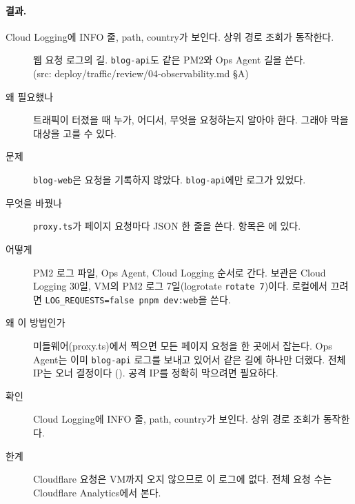 \paragraph{결과.}
Cloud Logging에 INFO 줄, path, country가 보인다.
상위 경로 조회가 동작한다.

\begin{figure}[H]
  \centering
  \caption{웹 요청 로그의 길. \texttt{blog-api}도 같은 PM2와 Ops Agent 길을 쓴다.
  (src: deploy/traffic/review/04-observability.md §A)}\label{fig:06-log-pipeline}
\end{figure}

\begin{description}
  \item[왜 필요했나] 트래픽이 터졌을 때 누가, 어디서, 무엇을 요청하는지 알아야 한다. 그래야 막을 대상을 고를 수 있다.
  \item[문제] \texttt{blog-web}은 요청을 기록하지 않았다. \texttt{blog-api}에만 로그가 있었다.
  \item[무엇을 바꿨나] \texttt{proxy.ts}가 페이지 요청마다 JSON 한 줄을 쓴다. 항목은 에 있다.
  \item[어떻게] PM2 로그 파일, Ops Agent, Cloud Logging 순서로 간다. 보관은 Cloud Logging 30일, VM의 PM2 로그 7일(logrotate \texttt{rotate 7})이다. 로컬에서 끄려면 \texttt{LOG\_REQUESTS=false pnpm dev:web}을 쓴다.
  \item[왜 이 방법인가] 미들웨어(proxy.ts)에서 찍으면 모든 페이지 요청을 한 곳에서 잡는다. Ops Agent는 이미 \texttt{blog-api} 로그를 보내고 있어서 같은 길에 하나만 더했다. 전체 IP는 오너 결정이다 (). 공격 IP를 정확히 막으려면 필요하다.
  \item[확인] Cloud Logging에 INFO 줄, path, country가 보인다. 상위 경로 조회가 동작한다.
  \item[한계] Cloudflare  요청은 VM까지 오지 않으므로 이 로그에 없다. 전체 요청 수는 Cloudflare Analytics에서 본다.
\end{description}


